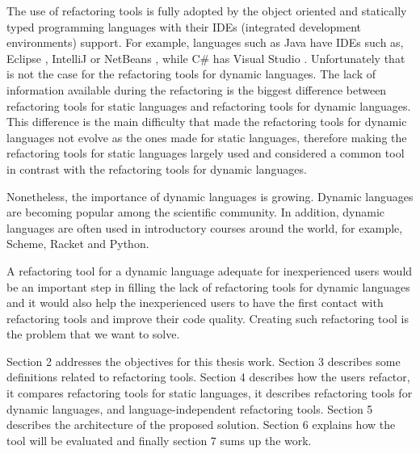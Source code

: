 The use of refactoring tools is fully adopted by the object oriented and statically typed programming languages with their IDEs (integrated development environments) support.
For example, languages such as Java have IDEs such as, Eclipse \cite{carlson2005eclipse}, IntelliJ \cite{bock2011intellij} or NetBeans \cite{boudreau2002netbeans}, while C\# has Visual Studio \cite{guckenheimer2006software}.
Unfortunately that is not the case for the refactoring tools for dynamic languages. 
The lack of information available during the refactoring is the biggest difference between refactoring tools for static languages and refactoring tools for dynamic languages.
This difference is the main difficulty that made the refactoring tools for dynamic languages not evolve as the ones made for static languages, therefore making the refactoring tools for static languages largely used and considered a common tool in contrast with the refactoring tools for dynamic languages.   

Nonetheless, the importance of dynamic languages is growing. Dynamic languages are becoming popular among the scientific community.
In addition, dynamic languages are often used in introductory courses around the world, for example, Scheme, Racket and Python.

A refactoring tool for a dynamic language adequate for inexperienced users would be an important step in filling the lack of refactoring tools for dynamic languages and it would also help the inexperienced users to have the first contact with refactoring tools and improve their code quality. Creating such refactoring tool is the problem that we want to solve.



Section 2 addresses the objectives for this thesis work. 
Section 3 describes some definitions related to refactoring tools.
Section 4 describes how the users refactor, it compares refactoring tools for static languages, it describes refactoring tools for dynamic languages, and language-independent refactoring tools.
Section 5 describes the architecture of the proposed solution. 
Section 6 explains how the tool will be evaluated and finally section 7 sums up the work.







